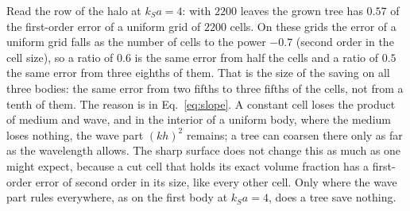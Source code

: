\documentclass[11pt,a4paper]{article}
\begin{document}
Read the row of the halo at $k_Sa=4$: with $2200$ leaves the grown tree has $0.57$ of the first-order
error of a uniform grid of $2200$ cells. On these grids the error of a uniform grid falls as the number of
cells to the power $-0.7$ (second order in the cell size), so a ratio of $0.6$ is the same error from half
the cells and a ratio of $0.5$ the same error from three eighths of them. That is the size of the saving
on all three bodies: the same error from two fifths to three fifths of the cells, not from a tenth of
them. The reason is in
Eq.~\eqref{eq:slope}. A constant cell loses the product of medium and wave, and in the interior of a
uniform body, where the medium loses nothing, the wave part $(kh)^2$ remains; a tree can coarsen there
only as far as the wavelength allows. The sharp surface does not change this as much as one might expect,
because a cut cell that holds its exact volume fraction has a first-order error of second order in its
size, like every other cell. Only where the wave part rules everywhere, as on the first body at $k_Sa=4$,
does a tree save nothing.
\end{document}
